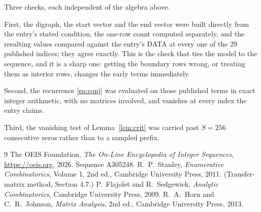 \documentclass[11pt,a4paper]{article}
\theoremstyle{plain}
\theoremstyle{definition}
\begin{document}
Three checks, each independent of the algebra above.

First, the digraph, the start vector and the end vector were built directly from the
entry's stated condition, the one-row count computed separately, and the resulting values
compared against the entry's DATA at every one of the $29$ published indices; they
agree exactly. This is the check that ties the model to the sequence, and it is a sharp one:
getting the boundary rows wrong, or treating them as interior rows, changes the early terms
immediately.

Second, the recurrence \eqref{eq:conj} was evaluated on those published terms in exact
integer arithmetic, with no matrices involved, and vanishes at every index the entry claims.

Third, the vanishing test of Lemma~\ref{lem:crit} was carried past $S=256$ consecutive
zeros rather than to a sampled prefix.

\begin{thebibliography}{9}
 The OEIS Foundation, \emph{The On-Line Encyclopedia of Integer
Sequences}, \url{https://oeis.org}, 2026. Sequence A305248.
 R.~P.~Stanley, \emph{Enumerative Combinatorics}, Volume 1, 2nd ed.,
Cambridge University Press, 2011. (Transfer-matrix method, Section 4.7.)
 P.~Flajolet and R.~Sedgewick, \emph{Analytic Combinatorics}, Cambridge
University Press, 2009.
 R.~A.~Horn and C.~R.~Johnson, \emph{Matrix Analysis}, 2nd ed., Cambridge
University Press, 2013.
\end{thebibliography}
\end{document}
